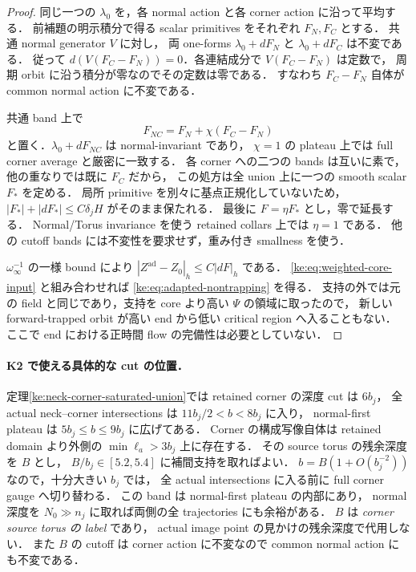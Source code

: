 \begin{proof}
同じ一つの $\lambda_0$ を，各 normal action と各 corner action に沿って平均する．
前補題の明示積分で得る scalar primitives をそれぞれ $F_N,F_C$ とする．
共通 normal generator $V$ に対し，
両 one-forms $\lambda_0+dF_N$ と $\lambda_0+dF_C$ は不変である．
従って $d(V(F_C-F_N))=0$．各連結成分で $V(F_C-F_N)$ は定数で，
周期 orbit に沿う積分が零なのでその定数は零である．
すなわち $F_C-F_N$ 自体が common normal action に不変である．

共通 band 上で
\[
 F_{NC}=F_N+\chi(F_C-F_N)
\]
と置く．$\lambda_0+dF_{NC}$ は normal-invariant であり，
$\chi=1$ の plateau 上では full corner average と厳密に一致する．
各 corner への二つの bands は互いに素で，他の重なりでは既に $F_C$ だから，
この処方は全 union 上に一つの smooth scalar $F_*$ を定める．
局所 primitive を別々に基点正規化していないため，
$|F_*|+|dF_*|\le C\delta_jH$ がそのまま保たれる．
最後に $F=\eta F_*$ とし，零で延長する．
Normal/Torus invariance を使う retained collars 上では $\eta=1$ である．
他の cutoff bands には不変性を要求せず，重み付き smallness を使う．

$\omega_\infty^{-1}$ の一様 bound により
$|Z^{\mathrm{ad}}-Z_0|_h\le C|dF|_h$ である．
\eqref{ke:eq:weighted-core-input} と組み合わせれば
\eqref{ke:eq:adapted-nontrapping} を得る．
支持の外では元の field と同じであり，支持を core より高い $\Psi$ の領域に取ったので，
新しい forward-trapped orbit が高い end から低い critical region へ入ることもない．
ここで end における正時間 flow の完備性は必要としていない．
\end{proof}

\paragraph{K2 で使える具体的な cut の位置．}
定理\ref{ke:neck-corner-saturated-union}では retained corner の深度 cut は $6b_j$，
全 actual neck--corner intersections は $11b_j/2<b<8b_j$ に入り，
normal-first plateau は $5b_j\le b\le9b_j$ に広げてある．
Corner の構成写像自体は retained domain より外側の
$\min\ell_a>3b_j$ 上に存在する．
その source torus の残余深度を $B$ とし，
$B/b_j\in[5.2,5.4]$ に補間支持を取ればよい．
$b=B(1+O(b_j^{-2}))$ なので，十分大きい $b_j$ では，
全 actual intersections に入る前に full corner gauge へ切り替わる．
この band は normal-first plateau の内部にあり，
normal 深度を $N_0\gg n_j$ に取れば両側の全 trajectories にも余裕がある．
$B$ は \emph{corner source torus の label} であり，
actual image point の見かけの残余深度で代用しない．
また $B$ の cutoff は corner action に不変なので common normal action にも不変である．

